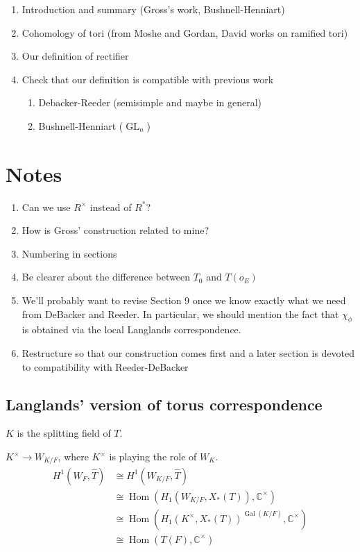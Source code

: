 \documentclass{article}
\DeclareMathOperator{\Hom}{Hom}
\DeclareMathOperator{\Gal}{Gal}
\DeclareMathOperator{\GL}{GL}
\newcommand{\CC}{\mathbb{C}}
\begin{document}
\begin{enumerate}
\item Introduction and summary (Gross's work, Bushnell-Henniart)
\item Cohomology of tori (from Moshe and Gordan, David works on ramified tori)
\item Our definition of rectifier
\item Check that our definition is compatible with previous work
\begin{enumerate}
\item Debacker-Reeder (semisimple and maybe in general)
\item Bushnell-Henniart ($\GL_n$)
\end{enumerate}

\end{enumerate}

\section{Notes}

\begin{enumerate}
\item Can we use $R^\times$ instead of $R^*$?
\item How is Gross' construction related to mine?
\item Numbering in sections
\item Be clearer about the difference between $T_0$ and $T(o_E)$
\item We'll probably want to revise Section 9 once we know exactly what we need from DeBacker and Reeder.  In particular, we should mention the fact that $\chi_\phi$ is obtained via the local Langlands correspondence.
\item  Restructure so that our construction comes first and a later section is devoted to compatibility with Reeder-DeBacker
\end{enumerate}

\subsection{Langlands' version of torus correspondence}

$K$ is the splitting field of $T$.

$K^\times \rightarrow W_{K/F}$, where $K^\times$ is playing the role of $W_K$.
\begin{align*}
H^1(W_F, \hat{T}) &\cong H^1(W_{K/F}, \hat{T}) \\
&\cong \Hom(H_1(W_{K/F}, X_*(T)), \CC^\times) \\
&\cong \Hom(H_1(K^\times, X_*(T))^{\Gal(K/F)}, \CC^\times) \\
&\cong \Hom(T(F), \CC^\times)
\end{align*}
\end{document}
